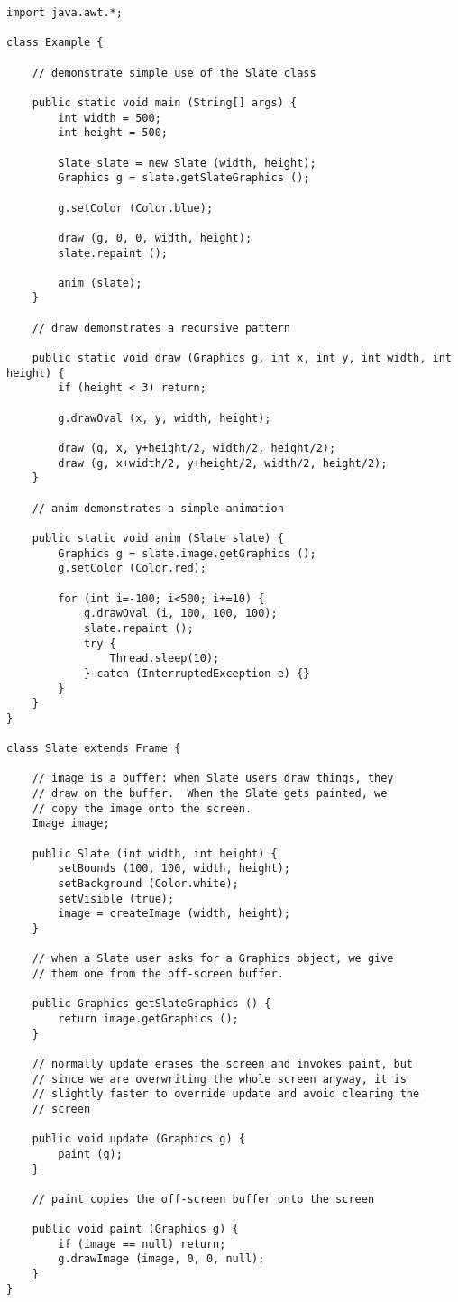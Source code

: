 \documentclass{book}
\begin{document}
\begin{verbatim}
import java.awt.*;

class Example {

    // demonstrate simple use of the Slate class

    public static void main (String[] args) {
        int width = 500;
        int height = 500;
	
        Slate slate = new Slate (width, height);
        Graphics g = slate.getSlateGraphics ();

        g.setColor (Color.blue);

        draw (g, 0, 0, width, height);
        slate.repaint ();
	
        anim (slate);
    }

    // draw demonstrates a recursive pattern
    
    public static void draw (Graphics g, int x, int y, int width, int height) {
        if (height < 3) return;
	
        g.drawOval (x, y, width, height);
	
        draw (g, x, y+height/2, width/2, height/2);
        draw (g, x+width/2, y+height/2, width/2, height/2);
    }
    
    // anim demonstrates a simple animation
    
    public static void anim (Slate slate) {
        Graphics g = slate.image.getGraphics ();
        g.setColor (Color.red);
	
        for (int i=-100; i<500; i+=10) {
            g.drawOval (i, 100, 100, 100);
            slate.repaint ();
            try {
                Thread.sleep(10);
            } catch (InterruptedException e) {}
        }
    }
}

class Slate extends Frame {
    
    // image is a buffer: when Slate users draw things, they
    // draw on the buffer.  When the Slate gets painted, we
    // copy the image onto the screen.
    Image image;
    
    public Slate (int width, int height) {
        setBounds (100, 100, width, height);
        setBackground (Color.white);
        setVisible (true);
        image = createImage (width, height);
    }
    
    // when a Slate user asks for a Graphics object, we give
    // them one from the off-screen buffer.
    
    public Graphics getSlateGraphics () {
        return image.getGraphics ();
    }
    
    // normally update erases the screen and invokes paint, but
    // since we are overwriting the whole screen anyway, it is
    // slightly faster to override update and avoid clearing the
    // screen
    
    public void update (Graphics g) {
        paint (g);
    }
    
    // paint copies the off-screen buffer onto the screen
    
    public void paint (Graphics g) {
        if (image == null) return;
        g.drawImage (image, 0, 0, null);
    }
}
\end{verbatim}
\end{document}
